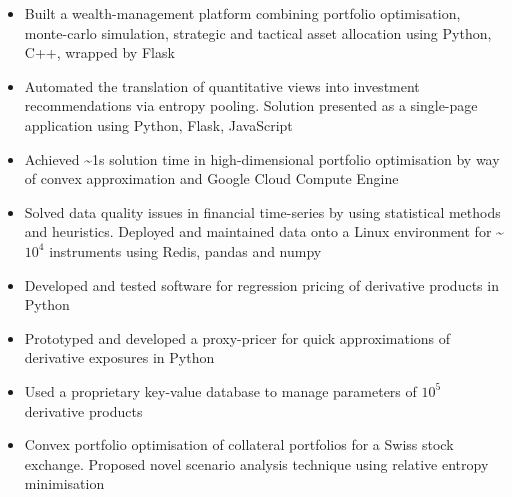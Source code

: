 \documentclass[10pt,a4paper,ragged2e]{altacv}
\begin{document}
\begin{paracol}{2}


\begin{itemize}
\item Built a wealth-management platform combining portfolio optimisation, monte-carlo simulation,
strategic and tactical asset allocation using Python, C++, wrapped by Flask
\item Automated the translation of quantitative views into investment recommendations via entropy pooling. Solution presented as a single-page application using Python, Flask, JavaScript
\item Achieved \textasciitilde 1s solution time in high-dimensional portfolio optimisation by way of convex approximation and Google Cloud Compute Engine 
\item Solved data quality issues in financial time-series by using statistical methods and heuristics. Deployed and maintained data onto a Linux environment for \textasciitilde $10^4$ instruments using Redis, pandas and numpy

\end{itemize}

\divider

\begin{itemize}
\item Developed and tested software for regression pricing of derivative products in Python
\item Prototyped and developed a proxy-pricer for quick approximations of derivative exposures in Python
\item Used a proprietary key-value database to manage parameters of $10^5$ derivative products 
\item Convex portfolio optimisation of collateral portfolios for a Swiss stock exchange. Proposed novel scenario analysis technique using relative entropy minimisation
\end{itemize}


\end{paracol}
\end{document}
